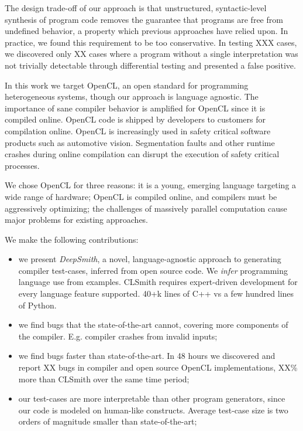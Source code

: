 The design trade-off of our approach is that unstructured, syntactic-level synthesis of program code removes the guarantee that programs are free from undefined behavior, a property which previous approaches have relied upon. In practice, we found this requirement to be too conservative. In testing XXX cases, we discovered only XX cases where a program without a single interpretation was not trivially detectable through differential testing and presented a false positive.

In this work we target OpenCL, an open standard for programming heterogeneous systems, though our approach is language agnostic. The importance of sane compiler behavior is amplified for OpenCL since it is compiled online. OpenCL code is shipped by developers to customers for compilation online. OpenCL is increasingly used in safety critical software products such as automotive vision. Segmentation faults and other runtime crashes during online compilation can disrupt the execution of safety critical processes.

We chose OpenCL for three reasons:
it is a young, emerging language targeting a wide range of hardware;
OpenCL is compiled online, and compilers must be aggressively optimizing;
the challenges of massively parallel computation cause major problems for existing approaches.

We make the following contributions:
%
\begin{itemize}
\item we present \emph{DeepSmith}, a novel, language-agnostic approach to generating compiler test-cases, inferred from open source code. We \emph{infer} programming language use from examples. CLSmith requires expert-driven development for every language feature supported. 40+k lines of C++ vs a few hundred lines of Python.
\item we find bugs that the state-of-the-art cannot, covering more components of the compiler. E.g. compiler crashes from invalid inputs;
\item we find bugs faster than state-of-the-art. In 48 hours we discovered and report XX bugs in compiler and open source OpenCL implementations, XX\% more than CLSmith over the same time period;
\item our test-cases are more interpretable than other program generators, since our code is modeled on human-like constructs. Average test-case size is two orders of magnitude smaller than state-of-the-art;
\end{itemize}
